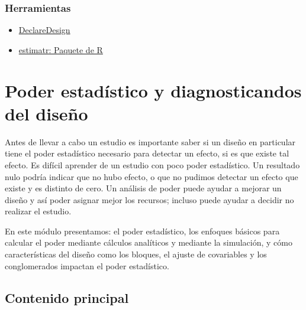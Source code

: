 \documentclass[12pt,spanish,]{book}
\begin{document}
\hypertarget{herramientas-2}{%
\subsection{Herramientas}\label{herramientas-2}}

\begin{itemize}
\item
  \href{https://declaredesign.org}{DeclareDesign}
\item
  \href{https://declaredesign.org/r/estimatr/}{estimatr: Paquete de R}
\end{itemize}

\hypertarget{poder-estaduxedstico-y-diagnosticandos-del-diseuxf1o}{%
\chapter{Poder estadístico y diagnosticandos del diseño}\label{poder-estaduxedstico-y-diagnosticandos-del-diseuxf1o}}

Antes de llevar a cabo un estudio es importante saber si un diseño en particular tiene el poder estadístico necesario para detectar un efecto, si es que existe tal efecto. Es difícil aprender de un estudio con poco poder estadístico. Un resultado nulo podría indicar que no hubo efecto, o que no pudimos detectar un efecto que existe y es distinto de cero. Un análisis de poder puede ayudar a mejorar un diseño y así poder asignar mejor los recursos; incluso puede ayudar a decidir no realizar el estudio.

En este módulo presentamos: el poder estadístico, los enfoques básicos para calcular el poder mediante cálculos analíticos y mediante la simulación, y cómo características del diseño como los bloques, el ajuste de covariables y los conglomerados impactan el poder estadístico.

\hypertarget{contenido-principal-5}{%
\section{Contenido principal}\label{contenido-principal-5}}
\end{document}
